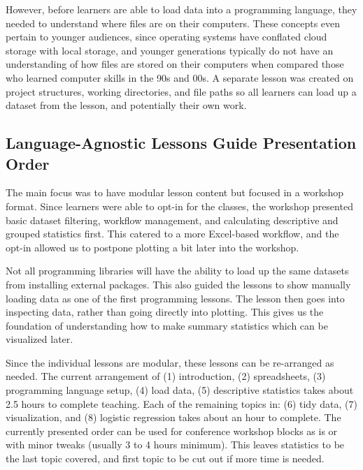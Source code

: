 \documentclass[030-workshop.tex]{subfiles}
\begin{document}
        However, before learners are able to load data into a programming language,
        they needed to understand where files are on their computers.
        These concepts even pertain to younger audiences,
        since operating systems have conflated cloud storage with local storage,
        and younger generations typically do not have an understanding of how files are stored on their computers
        when compared those who learned computer skills in the 90s and 00s. %
        A separate lesson was created on project structures, working directories, and file paths
        so all learners can load up a dataset from the lesson, and potentially their own work.

    \subsection{Language-Agnostic Lessons Guide Presentation Order}

        The main focus was to have modular lesson content but focused in a workshop format.
        Since learners were able to opt-in for the classes,
        the workshop presented basic dataset filtering, workflow management, and calculating descriptive and grouped statistics first.
        This catered to a more Excel-based workflow,
        and the opt-in allowed us to postpone plotting a bit later into the workshop.

        Not all programming libraries will have the ability to load up the same datasets from installing external packages.
        This also guided the lessons to show manually loading data as one of the first programming lessons.
        The lesson then goes into inspecting data, rather than going directly into plotting.
        This gives us the foundation of understanding how to make summary statistics which can be visualized later.

        Since the individual lessons are modular, these lessons can be re-arranged as needed.
        The current arrangement of
        (1) introduction,
        (2) spreadsheets,
        (3) programming language setup,
        (4) load data,
        (5) descriptive statistics
        takes about 2.5 hours to complete teaching.
        Each of the remaining topics in:
        (6) tidy data,
        (7) visualization, and
        (8) logistic regression
        takes about an hour to complete.
        The currently presented order can be used for conference workshop blocks as is or with minor tweaks (usually 3 to 4 hours minimum).
        This leaves statistics to be the last topic covered, and first topic to be cut out if more time is needed.
\end{document}
